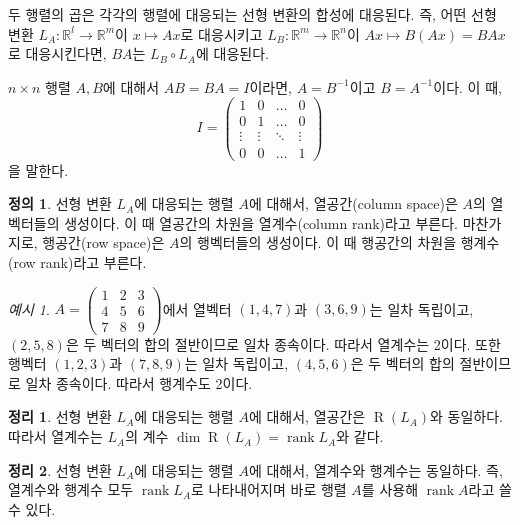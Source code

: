 \documentclass[unfonts,oneside,a4paper]{oblivoir}
\theoremstyle{definition}
\newtheorem{definition}{정의}
\theoremstyle{theorem}
\newtheorem{theorem}{정리}
\theoremstyle{remark}
\theoremstyle{remark}
\theoremstyle{remark}
\newtheorem*{example}{예시}
\theoremstyle{remark}
\renewcommand{\vec}[1]{\bm{\mathit{#1}}}
\DeclareMathOperator{\Range}{R}
\DeclareMathOperator{\rank}{rank}
\begin{document}
두 행렬의 곱은 각각의 행렬에 대응되는 선형 변환의 합성에 대응된다.
즉, 어떤 선형 변환 $L_A: \mathbb R^l \rightarrow \mathbb R^m$이 $\vec x \mapsto A \vec x$로 대응시키고 $L_B: \mathbb R^m \rightarrow \mathbb R^n$이 $A \vec x \mapsto B(A \vec x) = BA \vec x$로 대응시킨다면, $BA$는 $L_B \circ L_A$에 대응된다.

$n \times n$ 행렬 $A, B$에 대해서 $AB = BA = I$이라면, $A = B^{-1}$이고 $B = A^{-1}$이다.
이 때,
\begin{equation*}
    I = \begin{pmatrix}
        1 & 0 & \dots & 0\\
        0 & 1 & \dots & 0\\
        \vdots & \vdots & \ddots & \vdots\\
        0 & 0 & \dots & 1
    \end{pmatrix}
\end{equation*}
을 말한다.

\begin{definition}
    선형 변환 $L_A$에 대응되는 행렬 $A$에 대해서, 열공간(column space)은 $A$의 열벡터들의 생성이다.
    이 때 열공간의 차원을 열계수(column rank)라고 부른다.
    마찬가지로, 행공간(row space)은 $A$의 행벡터들의 생성이다.
    이 때 행공간의 차원을 행계수(row rank)라고 부른다.
\end{definition}

\begin{example}
    $A = \begin{pmatrix}
        1 & 2 & 3\\
        4 & 5 & 6\\
        7 & 8 & 9
    \end{pmatrix}$에서 열벡터 $(1, 4, 7)$과 $(3, 6, 9)$는 일차 독립이고, $(2, 5, 8)$은 두 벡터의 합의 절반이므로 일차 종속이다.
    따라서 열계수는 2이다.
    또한 행벡터 $(1, 2, 3)$과 $(7, 8, 9)$는 일차 독립이고, $(4, 5, 6)$은 두 벡터의 합의 절반이므로 일차 종속이다.
    따라서 행계수도 2이다.
\end{example}

\begin{theorem} \label{thm:rank_matrix}
    선형 변환 $L_A$에 대응되는 행렬 $A$에 대해서, 열공간은 $\Range(L_A)$와 동일하다.
    따라서 열계수는 $L_A$의 계수 $\dim \Range(L_A) = \rank L_A$와 같다.
\end{theorem}

\begin{theorem} \label{thm:rank}
    선형 변환 $L_A$에 대응되는 행렬 $A$에 대해서, 열계수와 행계수는 동일하다.
    즉, 열계수와 행계수 모두 $\rank L_A$로 나타내어지며 바로 행렬 $A$를 사용해 $\rank A$라고 쓸 수 있다.
\end{theorem}
\end{document}
